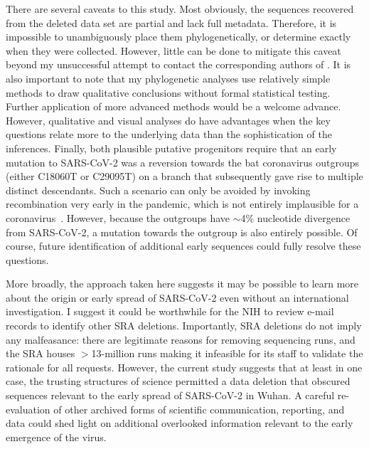\documentclass[9pt,twocolumn,twoside]{gsajnl_modified}
\begin{document}
There are several caveats to this study.
Most obviously, the sequences recovered from the deleted data set are partial and lack full metadata.
Therefore, it is impossible to unambiguously place them phylogenetically, or determine exactly when they were collected.
However, little can be done to mitigate this caveat beyond my unsuccessful attempt to contact the corresponding authors of \citet{wang2020medRxiv}.
It is also important to note that my phylogenetic analyses use relatively simple methods to draw qualitative conclusions without formal statistical testing.
Further application of more advanced methods would be a welcome advance.
However, qualitative and visual analyses do have advantages when the key questions relate more to the underlying data than the sophistication of the inferences.
Finally, both plausible putative progenitors require that an early mutation to SARS-CoV-2 was a reversion towards the bat coronavirus outgroups (either C18060T or C29095T) on a branch that subsequently gave rise to multiple distinct descendants.
Such a scenario can only be avoided by invoking recombination very early in the pandemic, which is not entirely implausible for a coronavirus~\citep{boni2020evolutionary}.
However, because the outgroups have $\sim$4\% nucleotide divergence from SARS-CoV-2, a mutation towards the outgroup is also entirely possible.
Of course, future identification of additional early sequences could fully resolve these questions.

More broadly, the approach taken here suggests it may be possible to learn more about the origin or early spread of SARS-CoV-2 even without an international investigation.
I suggest it could be worthwhile for the NIH to review e-mail records to identify other SRA deletions.
Importantly, SRA deletions do not imply any malfeasance: there are legitimate reasons for removing sequencing runs, and the SRA houses $>$13-million runs making it infeasible for its staff to validate the rationale for all requests.
However, the current study suggests that at least in one case, the trusting structures of science permitted a data deletion that obscured sequences relevant to the early spread of SARS-CoV-2 in Wuhan.
A careful re-evaluation of other archived forms of scientific communication, reporting, and data could shed light on additional overlooked information relevant to the early emergence of the virus.
\end{document}
